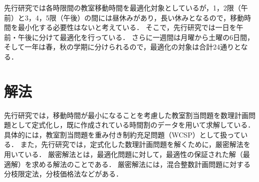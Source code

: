 \documentclass[12pt, a4paper, fleqn]{jreport}
\begin{document}
先行研究では各時限間の教室移動時間を最適化対象としているが，1，2限（午前）と3，4，5限（午後）の間には昼休みがあり，長い休みとなるので，移動時間を最小化する必要性はないと考えている．
そこで，先行研究では一日を午前・午後に分けて最適化を行っている．
さらに一週間は月曜から土曜の6日間，そして一年は春，秋の学期に分けられるので，最適化の対象は合計24通りとなる．

\section{解法}
先行研究では，移動時間が最小になることを考慮した教室割当問題を数理計画問題として定式化し，既に作成されている時間割のデータを用いて求解している．
具体的には，教室割当問題を重み付き制約充足問題（WCSP）として扱っている．
また，先行研究では，定式化した数理計画問題を解くために，厳密解法を用いている．
厳密解法とは，最適化問題に対して，最適性の保証された解（最適解）を求める解法のことである．
厳密解法には，混合整数計画問題に対する分枝限定法，分枝価格法などがある．

\fi
\end{document}
